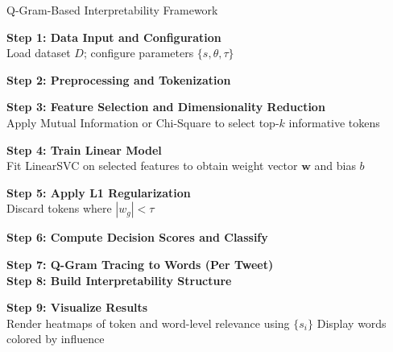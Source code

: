 \documentclass[runningheads,10pt]{llncs}
\begin{document}
\begin{algorithm}[ht]
\caption{Q-Gram-Based Interpretability Framework}
\label{alg:tracing}

\textbf{Step 1: Data Input and Configuration} \\
Load dataset $D$; configure parameters $\{s, \theta, \tau\}$

\textbf{Step 2: Preprocessing and Tokenization} \\

\textbf{Step 3: Feature Selection and Dimensionality Reduction} \\
Apply Mutual Information or Chi-Square to select top-$k$ informative tokens

\textbf{Step 4: Train Linear Model} \\
Fit LinearSVC on selected features to obtain weight vector $\mathbf{w}$ and bias $b$

\textbf{Step 5: Apply L1 Regularization} \\
Discard tokens where $|w_g| < \tau$

\textbf{Step 6: Compute Decision Scores and Classify} \\

\textbf{Step 7: Q-Gram Tracing to Words (Per Tweet)} \\
\textbf{Step 8: Build Interpretability Structure} \\

\textbf{Step 9: Visualize Results} \\
Render heatmaps of token and word-level relevance using $\{s_i\}$\;
Display words colored by influence
\end{algorithm}

\end{document}
